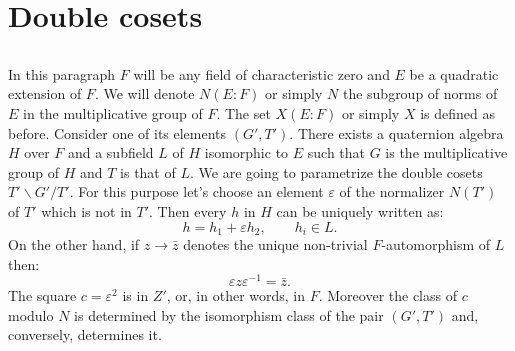 \section{Double cosets}

\subsection{}
In this paragraph $F$ will be any field of characteristic zero and $E$ be a quadratic extension of $F$.
We will denote $N(E:F)$ or simply $N$ the subgroup of norms of $E$ in the multiplicative group of $F$.
The set $X(E:F)$ or simply $X$ is defined as before.
Consider one of its elements $(G', T')$.
There exists a quaternion algebra $H$ over $F$ and a subfield $L$ of $H$ isomorphic to $E$ such that $G$ is the multiplicative group of $H$ and $T$ is that of $L$.
We are going to parametrize the double cosets $T' \backslash G' / T'$.
For this purpose let's choose an element $\varepsilon$ of the normalizer $N(T')$ of $T'$ which is not in $T'$.
Then every $h$ in $H$ can be uniquely written as:
\begin{equation}
h = h_1 + \varepsilon h_2, \qquad h_i \in L.
\end{equation}
On the other hand, if $z \to \bar{z}$ denotes the unique non-trivial $F$-automorphism of $L$ then:
\begin{equation}
\varepsilon z \varepsilon^{-1} = \bar{z}.
\end{equation}
The square $c = \varepsilon^2$ is in $Z'$, or, in other words, in $F$.
Moreover the class of $c$ modulo $N$ is determined by the isomorphism class of the pair $(G', T')$ and, conversely, determines it.

